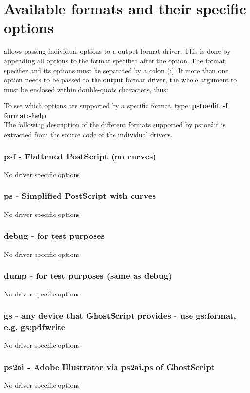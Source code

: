 \documentclass[english,a4paper]{article}
\begin{document}
\section{Available formats and their specific options}

 allows passing individual options to a output format driver. This is done by
appending all options to the format specified after the  option. The format
specifier and its options must be separated by a colon (:). If more than one
option needs to be passed to the output format driver, the whole argument to  must be
enclosed within double-quote characters, thus:


To see which options are supported by a specific format, type:
     \textbf{pstoedit -f format:-help}  
     \\ 

The following description of the different formats supported by pstoedit is extracted from the source code of the individual drivers.


\subsubsection{psf - Flattened PostScript (no curves)}
No driver specific options
\subsubsection{ps - Simplified PostScript with curves}
No driver specific options
\subsubsection{debug - for test purposes}
No driver specific options
\subsubsection{dump - for test purposes (same as debug)}
No driver specific options
\subsubsection{gs - any device that GhostScript provides - use gs:format, e.g. gs:pdfwrite}
No driver specific options
\subsubsection{ps2ai - Adobe Illustrator via ps2ai.ps of GhostScript}
No driver specific options
\end{document}
